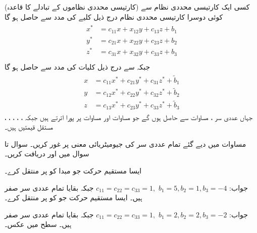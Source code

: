 \quad (کارتیسی محددی نظاموں کے تبادلے کا قاعدہ)
کسی ایک کارتیسی محددی نظام  سے کوئی دوسرا کارتیسی محددی نظام   درج ذیل کلیے کی مدد سے حاصل ہو گا
\begin{gather}
\begin{aligned}\label{مساوات_الاحصاء_عمومی_مستوی_تبادل_الف}
x^*&=c_{11}x+x_{12}y+c_{13}z+b_1\\
y^*&=c_{21}x+x_{22}y+c_{23}z+b_2\\
z^*&=c_{31}x+x_{32}y+c_{33}z+b_3\\
\end{aligned}
\end{gather}
جبکہ  سے  درج ذیل کلیات کی مدد سے حاصل ہو گا
\begin{gather}
\begin{aligned}\label{مساوات_الاحصاء_عمومی_مستوی_تبادل_ب}
x&=c_{11}x^*+c_{21}y^*+c_{31}z^*+\tilde{b}_1\\
y&=c_{12}x^*+c_{22}y^*+c_{32}z^*+\tilde{b}_2\\
z&=c_{13}x^*+c_{23}y^*+c_{33}z^*+\tilde{b}_3
\end{aligned}
\end{gather}
جہاں عددی سر ،  مساوات  سے حاصل ہوں گے جو مساوات  اور مساوات  پر پورا اترتے ہیں جبکہ ، ، ، ، ،  مستقل قیمتیں ہیں۔


مساوات  میں دیے گئے تمام عددی سر کی جیومیٹریائی  معنی پر غور کریں۔
سوال  تا سوال  میں  اور  دریافت کریں۔

ایسا مستقیم حرکت جو مبدا کو  پر منتقل کرے۔

جواب:
$c_{11}=c_{22}=c_{33}=1, \,\,b_1=5, b_2=1, b_3=-4$
جبکہ بقایا تمام عددی سر صفر ہیں۔
ایسا مستقیم حرکت جو  کو  پر منتقل کرے۔

جواب:
$c_{11}=c_{22}=c_{33}=1, \,\,b_1=2, b_2=2, b_3=-2$
جبکہ بقایا تمام عددی سر صفر ہیں۔
سطح  میں عکس۔

